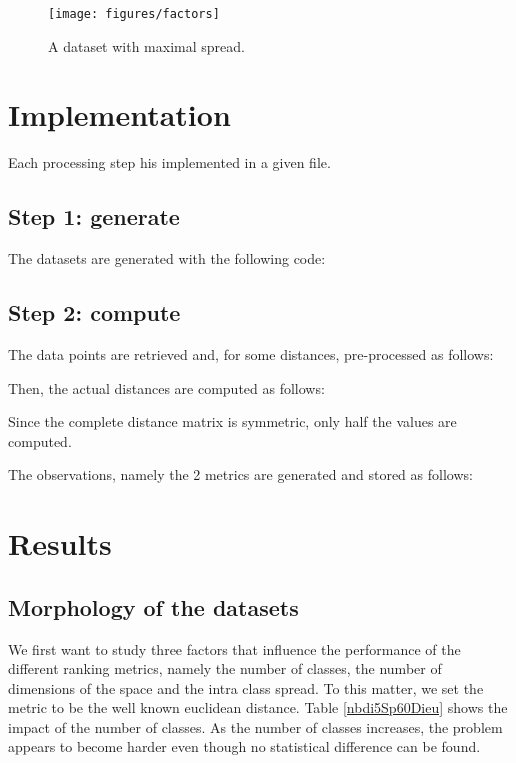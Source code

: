 \documentclass[12pt,a4paper,fleqn]{tufte-handout}
\begin{document}
\begin{figure}
\texttt{[image: figures/factors]}
\caption{A dataset with maximal spread.}
\label{scatter}
\end{figure}

\section{Implementation}

Each processing step his implemented in a given file.

\subsection{Step 1: generate}

The datasets are generated with the following code:


\subsection{Step 2: compute} 


The data points are retrieved and, for some distances, pre-processed as follows:
 

Then, the actual distances are computed as follows:
 
Since the complete distance matrix is symmetric, only half the values are computed.

The observations, namely the 2 metrics  are generated and stored as follows:
   

\section{Results}

\subsection{Morphology of the datasets}

We first want to study three factors that influence the performance of the different ranking metrics, namely the number of classes, the number of dimensions of the space and the intra class spread. To this matter, we set the metric to be the well known euclidean distance. Table \ref{nbdi5Sp60Dieu} shows the impact of the number of classes. As the number of classes increases, the problem appears to become harder even though no statistical difference can be found.
\end{document}
